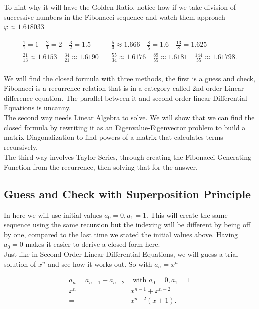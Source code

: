 \documentclass{article}
\begin{document}
To hint why it will have the Golden Ratio, notice how if we take division of successive numbers in the Fibonacci sequence and watch them approach $\varphi \approx 1.618033$

\begin{align*}
    \frac{1}{1}=1 \quad \frac{2}{1}=2 \quad \frac{3}{2}=1.5 &\quad \frac{5}{3}\approx1.666 \quad \frac{8}{5}=1.6 \quad \frac{13}{8}=1.625 \\
    \frac{21}{13}\approx1.6153 \quad \frac{34}{21}\approx1.6190 &\quad \frac{55}{34}\approx1.6176 \quad \frac{89}{55}\approx1.6181 \quad \frac{144}{55}\approx1.61798. \\
\end{align*}

We will find the closed formula with three methods, the first is a guess and check, Fibonacci is a recurrence relation that is in a category called 2nd order Linear difference equation. The parallel between it and second order linear Differential Equations is uncanny. \\

The second way needs Linear Algebra to solve. We will show that we can find the closed formula by rewriting it as an Eigenvalue-Eigenvector problem to build a matrix Diagonalization to find powers of a matrix that calculates terms recursively. \\

The third way involves Taylor Series, through creating the Fibonacci Generating Function from the recurrence, then solving that for the answer.

\subsection{Guess and Check with Superposition Principle}

In here we will use initial values $a_0=0, a_1=1$. This will create the same sequence using the same recursion but the indexing will be different by being off by one, compared to the last time we stated the initial values above. Having $a_0=0$ makes it easier to derive a closed form here. \\

Just like in Second Order Linear Differential Equations, we will guess a trial solution of $x^n$ and see how it works out. So with $a_n=x^n$

\begin{align*}
    a_n=a_{n-1}+a_{n-2}& \text{ with } a_0=0, a_1=1 \\
    x^n=&x^{n-1}+x^{n-2} \\
       =&x^{n-2}(x+1).
\end{align*}
\end{document}
